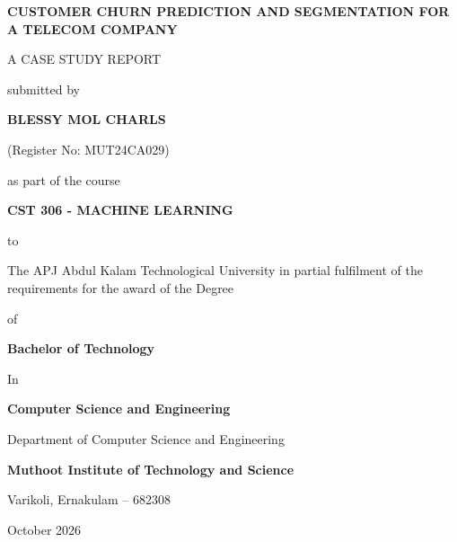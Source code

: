 
\begin{titlepage}
\begin{center}
    \vspace*{0.5cm}
    {\bfseries\LARGE CUSTOMER CHURN PREDICTION AND SEGMENTATION FOR A TELECOM COMPANY\par}
    
    \vspace{1.5cm}
    {\large A CASE STUDY REPORT\par}
    \vspace{0.4cm}
    {\large submitted by\par}
    \vspace{0.4cm}
    {\large\bfseries BLESSY MOL CHARLS\par}
    {\large (Register No: MUT24CA029)\par}
    
    \vspace{1.0cm}
    {\large as part of the course\par}
    \vspace{0.2cm}
    {\large\bfseries CST 306 - MACHINE LEARNING\par}
    
    \vspace{1.2cm}
    {\large to\par}
    \vspace{0.2cm}
    {\large The APJ Abdul Kalam Technological University in partial fulfilment of the requirements for the award of the Degree\par}
    \vspace{0.2cm}
    {\large of\par}
    \vspace{0.2cm}
    {\large\bfseries Bachelor of Technology\par}
    \vspace{0.2cm}
    {\large In\par}
    \vspace{0.2cm}
    {\large\bfseries Computer Science and Engineering\par}
    
    \vspace{1.2cm}
    {\large Department of Computer Science and Engineering\par}
    \vspace{0.2cm}
    {\large\bfseries Muthoot Institute of Technology and Science\par}
    \vspace{0.1cm}
    {\large Varikoli, Ernakulam -- 682308\par}
    \vspace{0.4cm}
    {\large October 2026\par}
\end{center}
\end{titlepage}

